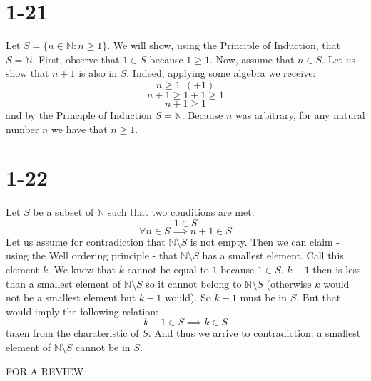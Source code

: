 \documentclass{article}
\begin{document}
\section*{1-21}
Let \(S = \{n \in \mathbb{N} : n \geq 1\}\). We will show, using the Principle of Induction, that \(S = \mathbb{N}\).
First, observe that \(1 \in S\) because \(1 \geq 1\). Now, assume that \(n \in S\). Let us show that \(n + 1\) is also in \(S\).
Indeed, applying some algebra we receive:
\begin{equation*}
    n \geq 1 \ \ (+1)
\end{equation*}
\begin{equation*}
    n + 1 \geq 1 + 1 \geq 1
\end{equation*}
\begin{equation*}
    n + 1 \geq 1 
\end{equation*}
and by the Principle of Induction \(S = \mathbb{N}\). Because \(n\) was arbitrary, for any natural number \(n\) we have that \(n \geq 1\).

\section*{1-22}
Let \(S\) be a subset of \(\mathbb{N}\) such that two conditions are met:
\begin{equation*}
    1 \in S
\end{equation*}
\begin{equation*}
    \forall n \in S \implies n + 1 \in S
\end{equation*}
Let us assume for contradiction that \(\mathbb{N } \setminus S \) is not empty. Then we can claim - using the Well ordering principle -
that \(\mathbb{N} \setminus S \) has a smallest element. Call this element \(k\). We know that \(k\) cannot be equal to \(1\) 
because \(1 \in S\). \(k - 1\) then is less than a smallest element of \(\mathbb{N} \setminus S\) so it cannot belong to
\(\mathbb{N} \setminus S\) (otherwise \(k\) would not be a smallest element but \(k-1\) would). So \(k - 1\) must be in \(S\).
But that would imply the following relation:
\begin{equation*}
    k - 1 \in S \implies k \in S
\end{equation*}
taken from the charateristic of \(S\). And thus we arrive to contradiction: 
a smallest element of \(\mathbb{N} \setminus S\) cannot be in \(S\).

\begin{center}
    FOR A REVIEW
\end{center}
\end{document}
